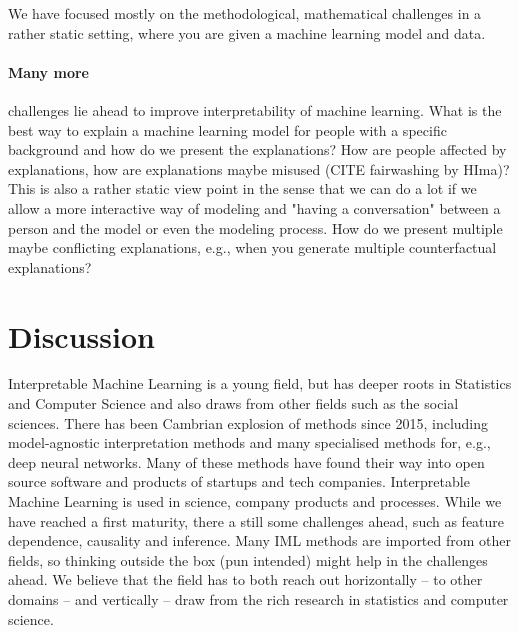 \documentclass[runningheads]{llncs}
\begin{document}
We have focused mostly on the methodological, mathematical challenges in a rather static setting, where you are given a machine learning model and data.
\paragraph{Many more} challenges lie ahead to improve interpretability of machine learning.
What is the best way to explain a machine learning model for people with a specific background and how do we present the explanations?
How are people affected by explanations, how are explanations maybe misused (CITE fairwashing by HIma)?
This is also a rather static view point in the sense that we can do a lot if we allow a more interactive way of modeling and "having a conversation" between a person and the model or even the modeling process.
How do we present multiple maybe conflicting explanations, e.g., when you generate multiple counterfactual explanations?

\section*{Discussion}

Interpretable Machine Learning is a young field, but has deeper roots in Statistics and Computer Science and also draws from other fields such as the social sciences.
There has been Cambrian explosion of methods since 2015, including model-agnostic interpretation methods and many specialised methods for, e.g., deep neural networks.
Many of these methods have found their way into open source software and products of startups and tech companies.
Interpretable Machine Learning is used in science, company products and processes.
While we have reached a first maturity, there a still some challenges ahead, such as feature dependence, causality and inference.
Many IML methods are imported from other fields, so thinking outside the box (pun intended) might help in the challenges ahead.
We believe that the field has to both reach out horizontally -- to other domains -- and vertically -- draw from the rich research in statistics and computer science.


%
%
%
% 
%

\vskip 0.2in


\end{document}
